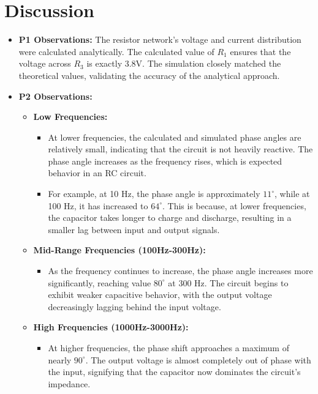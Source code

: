 \chapter{Discussion}

\begin{itemize}
    \item \textbf{P1 Observations:} The resistor network's voltage and current distribution were calculated analytically. The calculated value of $R_1$ ensures that the voltage across $R_3$ is exactly 3.8V. The simulation closely matched the theoretical values, validating the accuracy of the analytical approach.
    \item \textbf{P2 Observations:}
        \begin{itemize}
            \item \textbf{Low Frequencies:}
            \begin{itemize}
                \item At lower frequencies, the calculated and simulated phase angles are relatively small, indicating that the circuit is not heavily reactive. The phase angle increases as the frequency rises, which is expected behavior in an RC circuit.
                \item For example, at 10 Hz, the phase angle is approximately $11^{\circ}$, while at 100 Hz, it has increased to $64^{\circ}$. This is because, at lower frequencies, the capacitor takes longer to charge and discharge, resulting in a smaller lag between input and output signals.
                
            \end{itemize}
            \item \textbf{Mid-Range Frequencies (100Hz-300Hz):}
                \begin{itemize}
                    \item As the frequency continues to increase, the phase angle increases more significantly, reaching value $80^{\circ}$ at 300 Hz. The circuit begins to exhibit weaker capacitive behavior, with the output voltage decreasingly lagging behind the input voltage.
                \end{itemize}
            \item \textbf{High Frequencies (1000Hz-3000Hz):}
                \begin{itemize}
                    \item At higher frequencies, the phase shift approaches a maximum of nearly $90^{\circ}$. The output voltage is almost completely out of phase with the input, signifying that the capacitor now dominates the circuit's impedance.
                \end{itemize}
        \end{itemize}
\end{itemize}
